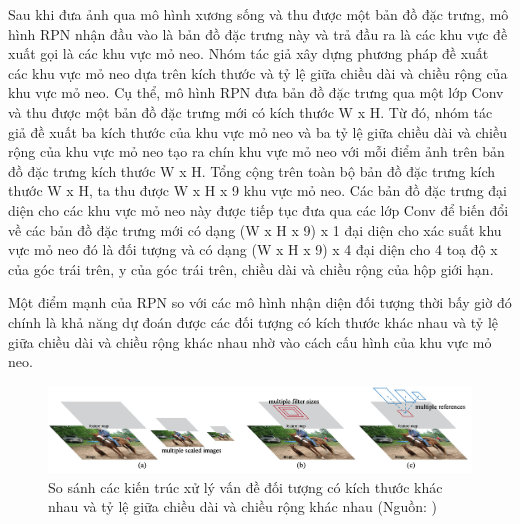 {    \noindent
    Sau khi đưa ảnh qua mô hình xương sống và thu được một bản đồ đặc trưng, mô hình RPN nhận đầu vào là bản đồ đặc trưng này và trả đầu ra là các khu vực đề xuất gọi là các khu vực mỏ neo.
    Nhóm tác giả xây dựng phương pháp đề xuất các khu vực mỏ neo dựa trên kích thước và tỷ lệ giữa chiều dài và chiều rộng của khu vực mỏ neo.
    Cụ thể, mô hình RPN đưa bản đồ đặc trưng qua một lớp Conv và thu được một bản đồ đặc trưng mới có kích thước W x H.
    Từ đó, nhóm tác giả đề xuất ba kích thước của khu vực mỏ neo và ba tỷ lệ giữa chiều dài và chiều rộng của khu vực mỏ neo tạo ra chín khu vực mỏ neo với mỗi điểm ảnh trên bản đồ đặc trưng kích thước W x H.
    Tổng cộng trên toàn bộ bản đồ đặc trưng kích thước W x H, ta thu được W x H x 9 khu vực mỏ neo.
    Các bản đồ đặc trưng đại diện cho các khu vực mỏ neo này được tiếp tục đưa qua các lớp Conv để biến đổi về các bản đồ đặc trưng mới có dạng (W x H x 9) x 1 đại diện cho xác suất khu vực mỏ neo đó là đối tượng và có dạng (W x H x 9) x 4 đại diện cho 4 toạ độ x của góc trái trên, y của góc trái trên, chiều dài và chiều rộng của hộp giới hạn.

    \noindent
    Một điểm mạnh của RPN so với các mô hình nhận diện đối tượng thời bấy giờ đó chính là khả năng dự đoán được các đối tượng có kích thước khác nhau và tỷ lệ giữa chiều dài và chiều rộng khác nhau nhờ vào cách cấu hình của khu vực mỏ neo.

    \begin{figure}[H]
        \centering
        \includegraphics[width=15cm] {images/faster_rcnn_multi_scale_anchor}
        \caption{So sánh các kiến trúc xử lý vấn đề đối tượng có kích thước khác nhau và tỷ lệ giữa chiều dài và chiều rộng khác nhau (Nguồn: \cite{ren2015faster})}
        \label{fig:faster_rcnn_multi_scale_anchor}
    \end{figure}

}

